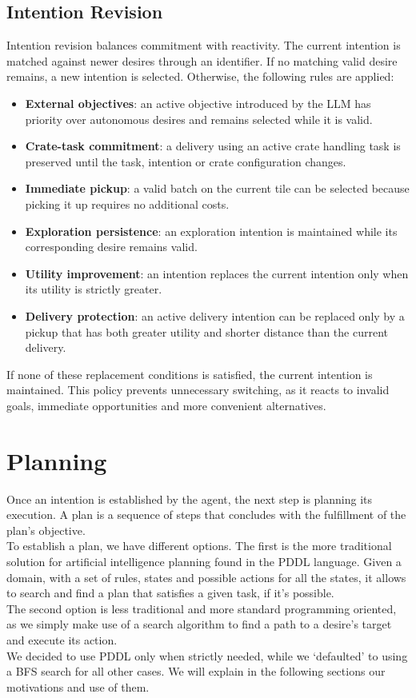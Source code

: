 \documentclass[11pt,a4paper]{article}
\begin{document}
\subsection{Intention Revision}
Intention revision balances commitment with reactivity. 
The current intention is matched against newer desires through an identifier. 
If no matching valid desire remains, a new intention is selected.
Otherwise, the following rules are applied:
\begin{itemize}
    \item \textbf{External objectives}: an active objective introduced by the LLM has priority over autonomous desires and remains selected while it is valid.
    \item \textbf{Crate-task commitment}: a delivery using an active crate handling task is preserved until the task, intention or crate configuration changes.
    \item \textbf{Immediate pickup}: a valid batch on the current tile can be selected because picking it up requires no additional costs.
    \item \textbf{Exploration persistence}: an exploration intention is maintained while its corresponding desire remains valid.
    \item \textbf{Utility improvement}: an intention replaces the current intention only when its utility is strictly greater.
    \item \textbf{Delivery protection}: an active delivery intention can be replaced only by a pickup that has both greater utility and shorter distance than the current delivery.
\end{itemize}
If none of these replacement conditions is satisfied, the current intention is maintained. 
This policy prevents unnecessary switching, as it reacts to invalid goals, immediate opportunities and more convenient alternatives.

\section{Planning}
Once an intention is established by the agent, the next step is planning its execution. A plan is a sequence of steps that concludes with the fulfillment of the plan's objective.
\\To establish a plan, we have different options. The first is the more traditional solution for artificial intelligence planning found in the PDDL language.
Given a domain, with a set of rules, states and possible actions for all the states, it allows to search and find a plan that satisfies a given task, if it's possible.
\\The second option is less traditional and more standard programming oriented, as we simply make use of a search algorithm to find a path to a desire's target and execute its action.
\\We decided to use PDDL only when strictly needed, while we `defaulted' to using a BFS search for all other cases. We will explain in the following sections our motivations and use of them.
\end{document}

